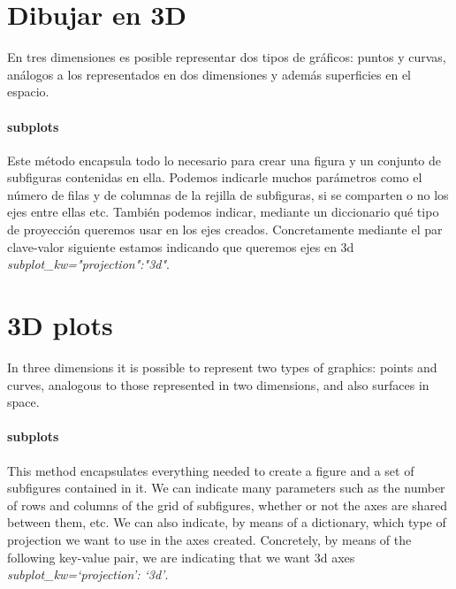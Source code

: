 \begin{paracol}{2}
\section{Dibujar en 3D}
En tres dimensiones es posible representar dos tipos de gráficos: puntos y curvas, análogos a los representados en dos dimensiones y además superficies en el espacio.

\paragraph{subplots} Este método encapsula todo lo necesario para crear una figura y un conjunto de subfiguras contenidas en ella. Podemos indicarle muchos parámetros como el número de filas y de columnas de la rejilla de subfiguras, si se comparten o no los ejes entre ellas etc. También podemos indicar, mediante un diccionario qué tipo de proyección queremos usar en los ejes creados. Concretamente mediante el par clave-valor siguiente estamos indicando que queremos ejes en 3d  \textit{subplot\_kw="projection":"3d"}.

\switchcolumn
\section{3D plots}
In three dimensions it is possible to represent two types of graphics: points and curves, analogous to those represented in two dimensions, and also surfaces in space.

\paragraph{subplots} This method encapsulates everything needed to create a figure and a set of subfigures contained in it. We can indicate many parameters such as the number of rows and columns of the grid of subfigures, whether or not the axes are shared between them, etc. We can also indicate, by means of a dictionary, which type of projection we want to use in the axes created. Concretely, by means of the following key-value pair, we are indicating that we want 3d axes \textit{subplot\_kw=‘projection’: ‘3d’}. 


\end{paracol}

